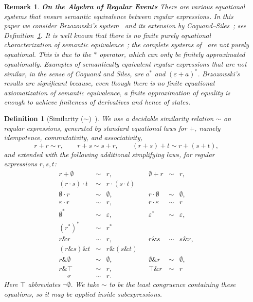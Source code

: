 \documentclass{article}
\newtheorem{definition}{Definition}[section]
\newtheorem{remark}{Remark}[section]
\begin{document}
 \begin{remark}{\bf On the Algebra of Regular Events}
{\em There are various equational systems that ensure semantic equivalence between regular expressions. In this paper we consider Brzozowski's system~\cite{B64} and its extension by Coquand--Siles~\cite{CoquandRegexEquality}; see Definition~\ref{def:similarity}. It is well known that there is no finite purely equational characterization of semantic equivalence~\cite{Redko}; the complete systems of~\cite{Salomaa,Kozen} are not purely equational. This is due to the $\ast$ operator, which can only be finitely approximated equationally. Examples of semantically equivalent regular expressions that are not similar, in the sense of Coquand and Siles, are $a^*$ and $(\varepsilon+a)^*$. Brzozowski's results are significant because, even though there is no finite equational axiomatization of semantic equivalence, a finite approximation of equality is enough to achieve finiteness of derivatives and hence of states.}
\end{remark}

\begin{definition}[Similarity ($\sim$)~\cite{CoquandRegexEquality}]
\label{def:similarity}
We use a decidable \emph{similarity} relation $\sim$ on regular expressions,
generated by standard equational laws for $+$, namely idempotence,
commutativity, and associativity,
\[
r+r \sim r,
\qquad
r+s \sim s+r,
\qquad
(r+s)+t \sim r+(s+t),
\]
and extended with the following additional simplifying laws, for regular
expressions $r,s,t$:
\[
\begin{array}{rclcrcl}
r+\emptyset &\sim& r, &&
\emptyset+r &\sim& r,\\[0.6ex]

(r\cdot s)\cdot t &\sim& r\cdot(s\cdot t)\\[0.4ex]
\emptyset\cdot r &\sim& \emptyset, &&
r\cdot\emptyset &\sim& \emptyset,\\[0.4ex]
\varepsilon\cdot r &\sim& r, &&
r\cdot\varepsilon &\sim& r\\[0.8ex]

\emptyset^* &\sim& \varepsilon, &&
\varepsilon^* &\sim& \varepsilon,\\[0.4ex]
(r^*)^* &\sim& r^*
\\[0.8ex]

r\&r &\sim& r, &&
r\&s &\sim& s\&r,\\[0.4ex]
(r\&s)\&t &\sim& r\&(s\&t)\\[0.4ex]
r\&\emptyset &\sim& \emptyset, &&
\emptyset\&r &\sim& \emptyset,\\[0.4ex]
r\&\top &\sim& r, &&
\top\&r &\sim& r\\[0.8ex]

\neg\neg r &\sim& r.
\end{array}
\]
Here $\top$ abbreviates $\neg\emptyset$. We take $\sim$ to be the least congruence containing these equations, so it may be applied inside subexpressions.
\end{definition}
\end{document}

